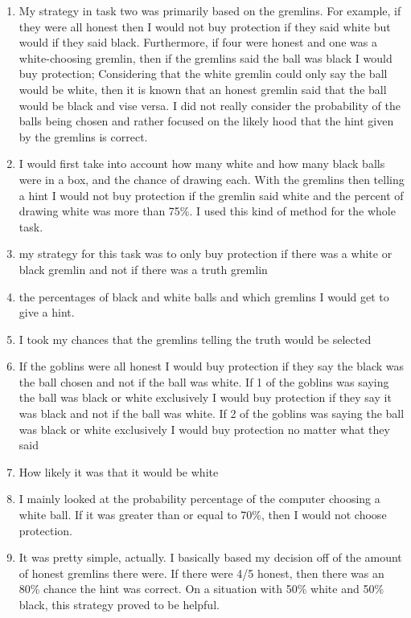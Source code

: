 \documentclass[12pt,a4paper]{article}
\begin{document}
\begin{appendices}
\begin{enumerate}
\item My strategy in task two was primarily based on the gremlins. For example, if they were all honest then I would not buy protection if they said white but would if they said black. Furthermore, if four were honest and one was a white-choosing gremlin, then if the gremlins said the ball was black I would buy protection; Considering that the white gremlin could only say the ball would be white, then it is known that an honest gremlin said that the ball would be black and vise versa. I did not really consider the probability of the balls being chosen and rather focused on the likely hood that the hint given by the gremlins is correct.

\item I would first take into account how many white and how many black balls were in a box, and the chance of drawing each. With the gremlins then telling a hint I would not buy protection if the gremlin said white and the percent of drawing white was more than 75\%. I used this kind of method for the whole task.

\item my strategy for this task was to only buy protection if there was a white or black gremlin and not if there was a truth gremlin

\item the percentages of black and white balls and which gremlins I would get to give a hint.

\item I took my chances that the gremlins telling the truth would be selected

\item If the goblins were all honest I would buy protection if they say the black was the ball chosen and not if the ball was white. If 1 of the goblins was saying the ball was black or white exclusively I would buy protection if they say it was black and not if the ball was white. If 2 of the goblins was saying the ball was black or white exclusively I would buy protection no matter what they said

\item How likely it was that it would be white

\item I mainly looked at the probability percentage of the computer choosing a white ball. If it was greater than or equal to 70\%, then I would not choose protection.

\item It was pretty simple, actually. I basically based my decision off of the amount of honest gremlins there were. If there were 4/5 honest, then there was an 80\% chance the hint was correct. On a situation with 50\% white and 50\% black, this strategy proved to be helpful.


\end{enumerate}
\end{appendices}
\end{document}
